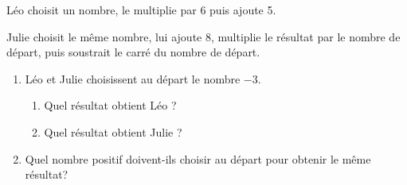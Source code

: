 
\medskip 

Léo choisit un nombre, le multiplie par 6 puis ajoute 5. 

Julie choisit le même nombre, lui ajoute 8, multiplie le résultat par le nombre de départ, puis soustrait le carré du nombre de départ. 

\medskip

\begin{enumerate}
\item Léo et Julie choisissent au départ le nombre $- 3$. 
	\begin{enumerate}
		\item 	Quel résultat obtient Léo ? 
		\item 	Quel résultat obtient Julie ? 
\end{enumerate}
\item Quel nombre positif doivent-ils choisir au départ pour obtenir le même résultat? 
\end{enumerate}

\vspace{0,5cm}

